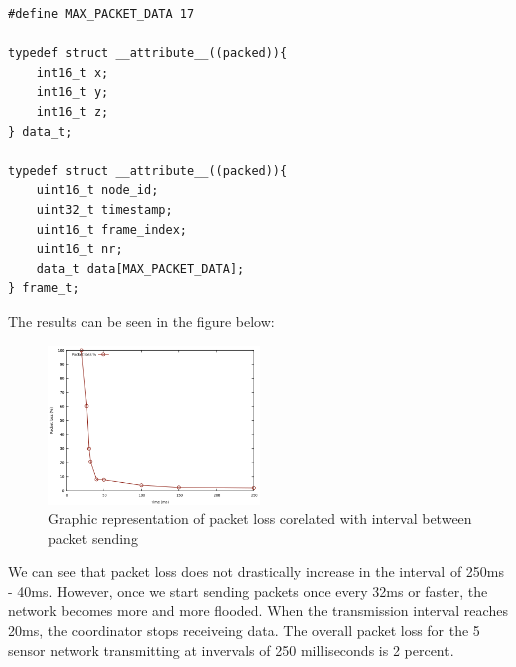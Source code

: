 \begin{lstlisting}
#define MAX_PACKET_DATA 17

typedef struct __attribute__((packed)){
	int16_t x;
	int16_t y;
	int16_t z;
} data_t;

typedef struct __attribute__((packed)){
	uint16_t node_id;
	uint32_t timestamp;
	uint16_t frame_index;
	uint16_t nr;
	data_t data[MAX_PACKET_DATA];
} frame_t;
\end{lstlisting}

The results can be seen in the figure below:

\begin{figure}[ht] \centering
  \includegraphics[width=0.5\textwidth]{img/packet-loss.png}
  \caption{Graphic representation of packet loss corelated with interval between packet sending}
\end{figure}

We can see that packet loss does not drastically increase in the interval of 250ms - 40ms. However, 
once we start sending packets once every 32ms or faster, the network becomes more and more flooded.
When the transmission interval reaches 20ms, the coordinator stops receiveing data. The overall packet
loss for the 5 sensor network transmitting at invervals of 250 milliseconds is 2 percent. 
